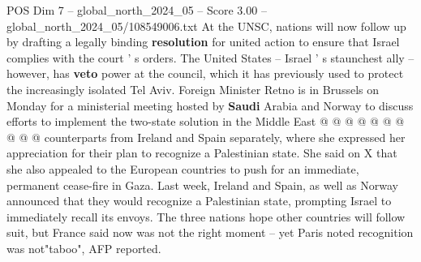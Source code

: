 \begin{textsample}{POS Dim 7 – global\_north\_2024\_05 – Score 3.00 – global\_north\_2024\_05/108549006.txt}
At the UNSC, nations will now follow up by drafting a legally binding \textbf{resolution} for united action to ensure that Israel complies with the court ' s orders.
The United States -- Israel ' s staunchest ally -- however, has \textbf{veto} power at the council, which it has previously used to protect the increasingly isolated Tel Aviv.
Foreign Minister Retno is in Brussels on Monday for a ministerial meeting hosted by \textbf{Saudi} Arabia and Norway to discuss efforts to implement the two-state solution in the Middle East @ @ @ @ @ @ @ @ @ @ counterparts from Ireland and Spain separately, where she expressed her appreciation for their plan to recognize a Palestinian state.
She said on X that she also appealed to the European countries to push for an immediate, permanent cease-fire in Gaza.
Last week, Ireland and Spain, as well as Norway announced that they would recognize a Palestinian state, prompting Israel to immediately recall its envoys.
The three nations hope other countries will follow suit, but France said now was not the right moment -- yet Paris noted recognition was not"taboo", AFP reported.

\end{textsample}

